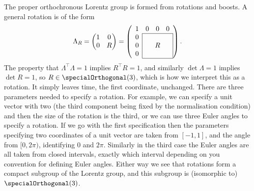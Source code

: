 \documentclass[fleqn]{NotesClass}
\newcommand{\trans}{\top}
\begin{document}
    The proper orthochronous Lorentz group is formed from rotations and boosts.
    A general rotation is of the form
    \begin{equation}
        \Lambda_R = 
        \begin{pmatrix}
            1 & 0\\
            0 & R
        \end{pmatrix}
        =
        \left(
            \begin{array}{cccc}
                1 & 0 & 0 & 0 \\ \cline{2-4}
                0 & \multicolumn{3}{|c|}{} \\
                0 & \multicolumn{3}{|c|}{R} \\
                0 & \multicolumn{3}{|c|}{} \\ \cline{2-4}
            \end{array}
        \right).
    \end{equation}
    The property that \(\Lambda^\trans \Lambda = 1\) implies \(R^\trans R = 1\), and similarly \(\det \Lambda = 1\) implies \(\det R = 1\), so \(R \in \specialOrthogonal(3)\), which is how we interpret this as a rotation.
    It simply leaves time, the first coordinate, unchanged.
    There are three parameters needed to specify a rotation.
    For example, we can specify a unit vector with two (the third component being fixed by the normalisation condition) and then the size of the rotation is the third, or we can use three Euler angles to specify a rotation.
    If we go with the first specification then the parameters specifying two coordinates of a unit vector are taken from \([-1, 1]\), and the angle from \([0, 2\pi)\), identifying \(0\) and \(2\pi\).
    Similarly in the third case the Euler angles are all taken from closed intervals, exactly which interval depending on you convention for defining Euler angles.
    Either way we see that rotations form a compact subgroup of the Lorentz group, and this subgroup is (isomorphic to) \(\specialOrthogonal(3)\).
    
\end{document}
